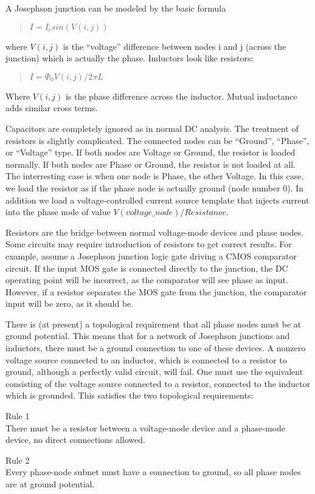 A Josephson junction can be modeled by the basic formula

\begin{quote}
$I = I_c sin(V(i,j))$
\end{quote}

where $V(i,j)$ is the ``voltage'' difference between nodes i and j
(across the junction) which is actually the phase.  Inductors look
like resistors:

\begin{quote}
$I = \Phi_0 V(i,j)/2{\pi}L$
\end{quote}

Where $V(i,j)$ is the phase difference across the inductor.  Mutual
inductance adds similar cross terms.

Capacitors are completely ignored as in normal DC analysis.  The
treatment of resistors is slightly complicated.  The connected nodes
can be ``Ground'', ``Phase'', or ``Voltage'' type.  If both nodes are
Voltage or Ground, the resistor is loaded normally.  If both nodes are
Phase or Ground, the resistor is not loaded at all.  The interresting
case is when one node is Phase, the other Voltage.  In this case, we
load the resistor as if the phase node is actually ground (node number
0).  In addition we load a voltage-controlled current source template
that injects current into the phase node of value
$V(voltage\_node)/Resistance$.

Resistors are the bridge between normal voltage-mode devices and phase
nodes.  Some circuits may require introduction of resistors to get
correct results.  For example, assume a Josephson junction logic gate
driving a CMOS comparator circuit.  If the input MOS gate is connected
directly to the junction, the DC operating point will be incorrect, as
the comparator will see phase as input.  However, if a resistor
separates the MOS gate from the junction, the comparator input will be
zero, as it should be.

There is (at present) a topological requirement that all phase nodes
must be at ground potential.  This means that for a network of
Josephson junctions and inductors, there must be a ground connection
to one of these devices.  A nonzero voltage source connected to an
inductor, which is connected to a resistor to ground, although a
perfectly valid circuit, will fail.  One must use the equivalent
consisting of the voltage source connected to a resistor, connected to
the inductor which is grounded.  This satisfies the two topological
requirements:

\begin{description}
\item{Rule 1}\\
There must be a resistor between a voltage-mode device and a
phase-mode device, no direct connections allowed.

\item{Rule 2}\\
Every phase-node subnet must have a connection to ground, so all phase
nodes are at ground potential.
\end{description}

